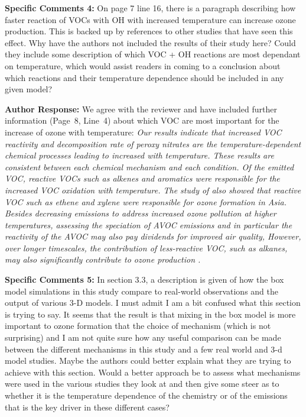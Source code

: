 \documentclass{article}
\begin{document}
\textbf{Specific Comments 4:} On page 7 line 16, there is a paragraph describing how faster reaction of VOCs with OH with increased temperature can increase ozone production. This is backed up by references to other studies that have seen this effect. Why have the authors not included the results of their study here? Could they include some description of which VOC + OH reactions are most dependant on temperature, which would assist readers in coming to a conclusion about which reactions and their temperature dependence should be included in any given model?

\textbf{Author Response:} We agree with the reviewer and have included further information (Page~8, Line~4) about which VOC are most important for the increase of ozone with temperature:
\textit{
Our results indicate that increased VOC reactivity and decomposition rate of peroxy nitrates are the temperature-dependent chemical processes leading to increased  with temperature.
These results are consistent between each chemical mechanism and each  condition.
Of the emitted VOC, reactive VOCs such as alkenes and aromatics were responsible for the increased VOC oxidation with temperature.
The study of \citet{Li:2014} also showed that reactive VOC such as ethene and xylene were responsible for ozone formation in Asia.
Besides decreasing  emissions to address increased ozone pollution at higher temperatures, assessing the speciation of AVOC emissions and in particular the reactivity of the AVOC may also pay dividends for improved air quality,
However, over longer timescales, the contribution of less-reactive VOC, such as alkanes, may also significantly contribute to ozone production \citep{Butler:2011, vonSchneidemesser:2016}.
}

\textbf{Specific Comments 5:} In section 3.3, a description is given of how the box model simulations in this study compare to real-world observations and the output of various 3-D models. I must admit I am a bit confused what this section is trying to say. It seems that the result is that mixing in the box model is more important to ozone formation that the choice of mechanism (which is not surprising) and I am not quite sure how any useful comparison can be made between the different mechanisms in this study and a few real world and 3-d model studies. Maybe the authors could better explain what they are trying to achieve with this section. Would a better approach be to assess what mechanisms were used in the various studies they look at and then give some steer as to whether it is the temperature dependence of the chemistry or of the emissions that is the key driver in these different cases?
\end{document}
